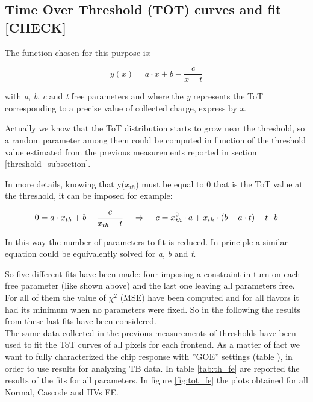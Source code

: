 \subsection{Time Over Threshold (TOT) curves and fit [CHECK]} \label{tot_fit}

The function chosen for this purpose is:

\begin{equation}
y(x) = a\cdot x +b -\frac{c}{x-t}
\label{fit_function}
\end{equation}

with \textit{a}, \textit{b}, \textit{c} and \textit{t} free parameters and where the \textit{y} represents the ToT corresponding to a precise value of collected charge, express by \textit{x}. 

Actually we know that the ToT distribution starts to grow near the threshold, so a random parameter among them could be computed in function of the threshold value estimated from the previous measurements reported in section \ref{threshold_subsection}.

In more details, knowing that y($x_{th}$) must be equal to 0 that is the ToT value at the threshold, it can be imposed for example:

\begin{equation}
0 = a\cdot x_{th} + b - \frac{c}{x_{th}-t}  \hspace{.4cm}	\Rightarrow  \hspace{.4cm}	c = x_{th}^{2}\cdot a + x_{th}\cdot (b-a\cdot t) - t\cdot b
\end{equation}

In this way the number of parameters to fit is reduced. In principle a similar equation could be equivalently solved for \textit{a}, \textit{b} and \textit{t}. 

So five different fits have been made: four imposing a constraint in turn on each free parameter (like shown above) and the last one leaving all parameters free. For all of them the value of $\chi^{2}$ (MSE) have been computed and for all flavors it had its minimum when no parameters were fixed. So in the following the results from these last fits have been considered.\\

The same data collected in the previous measurements of thresholds have been used to fit the ToT curves of all pixels for each frontend. As a matter of fact we want to fully characterized the chip response with ''GOE'' settings (table ), in order to use results for analyzing TB data.
In table \vref{tab:th_fe} are reported the results of the fits for all parameters. In figure \vref{fig:tot_fe} the plots obtained for all Normal, Cascode and HVs FE.

